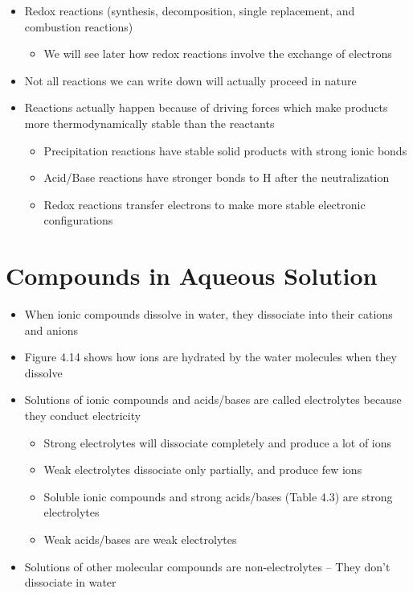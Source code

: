 \documentclass[12pt, openany, letterpaper]{memoir}
\begin{document}
\begin{itemize}
\begin{itemize}
		      \item {}
	      \end{itemize}
	\item Redox reactions (synthesis, decomposition, single replacement, and combustion reactions)
	      \begin{itemize}
		      \item We will see later how redox reactions involve the exchange of electrons
	      \end{itemize}
	\item Not all reactions we can write down will actually proceed in nature
	\item Reactions actually happen because of driving forces which make products more thermodynamically stable than the reactants
	      \begin{itemize}
		      \item Precipitation reactions have stable solid products with strong ionic bonds
		      \item Acid/Base reactions have stronger bonds to H after the neutralization
		      \item Redox reactions transfer electrons to make more stable electronic configurations
	      \end{itemize}
\end{itemize}
\section{Compounds in Aqueous Solution}
\begin{itemize}
	\item When ionic compounds dissolve in water, they dissociate into their cations and anions
	\item Figure 4.14 shows how ions are hydrated by the water molecules when they dissolve
	\item Solutions of ionic compounds and acids/bases are called electrolytes because they conduct electricity
	      \begin{itemize}
		      \item Strong electrolytes will dissociate completely and produce a lot of ions
		      \item Weak electrolytes dissociate only partially, and produce few ions
		      \item Soluble ionic compounds and strong acids/bases (Table 4.3) are strong electrolytes
		      \item Weak acids/bases are weak electrolytes
	      \end{itemize}
	\item Solutions of other molecular compounds are non-electrolytes -- They don't dissociate in water
\end{itemize}
\end{document}
